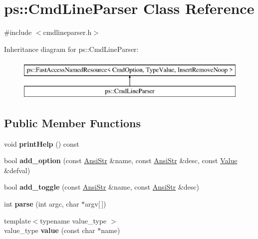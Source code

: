 \hypertarget{classps_1_1CmdLineParser}{}\section{ps\+:\+:Cmd\+Line\+Parser Class Reference}
\label{classps_1_1CmdLineParser}


{\ttfamily \#include $<$cmdlineparser.\+h$>$}

Inheritance diagram for ps\+:\+:Cmd\+Line\+Parser\+:\begin{figure}[H]
\begin{center}
\leavevmode
\includegraphics[height=2.000000cm]{classps_1_1CmdLineParser}
\end{center}
\end{figure}
\subsection*{Public Member Functions}
\begin{DoxyCompactItemize}
\item 
\hypertarget{classps_1_1CmdLineParser_a0fef7c6e1b7dd002b2d4659f9cd9573e}{}void {\bfseries print\+Help} () const \label{classps_1_1CmdLineParser_a0fef7c6e1b7dd002b2d4659f9cd9573e}

\item 
\hypertarget{classps_1_1CmdLineParser_af673f1be45ff2375565b68a2e1ff1098}{}bool {\bfseries add\+\_\+option} (const \hyperlink{classps_1_1base_1_1CAString}{Ansi\+Str} \&name, const \hyperlink{classps_1_1base_1_1CAString}{Ansi\+Str} \&desc, const \hyperlink{classps_1_1Value}{Value} \&defval)\label{classps_1_1CmdLineParser_af673f1be45ff2375565b68a2e1ff1098}

\item 
\hypertarget{classps_1_1CmdLineParser_acdf83dbfa8164c729da1866a575649b3}{}bool {\bfseries add\+\_\+toggle} (const \hyperlink{classps_1_1base_1_1CAString}{Ansi\+Str} \&name, const \hyperlink{classps_1_1base_1_1CAString}{Ansi\+Str} \&desc)\label{classps_1_1CmdLineParser_acdf83dbfa8164c729da1866a575649b3}

\item 
\hypertarget{classps_1_1CmdLineParser_a4dc856e77bc81a645fbc4914c6c2d903}{}int {\bfseries parse} (int argc, char $\ast$argv\mbox{[}$\,$\mbox{]})\label{classps_1_1CmdLineParser_a4dc856e77bc81a645fbc4914c6c2d903}

\item 
\hypertarget{classps_1_1CmdLineParser_abe3322652bcb6c45ee406672dece62ab}{}{\footnotesize template$<$typename value\+\_\+type $>$ }\\value\+\_\+type {\bfseries value} (const char $\ast$name)\label{classps_1_1CmdLineParser_abe3322652bcb6c45ee406672dece62ab}

\end{DoxyCompactItemize}
